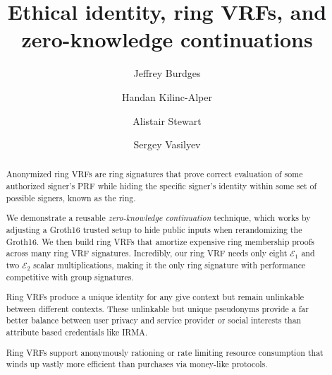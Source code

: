 \documentclass[runningheads,evcountsame,a4paper,11pt,orivec]{llncs}
\title{Ethical identity, ring VRFs, and zero-knowledge continuations}
\author{Jeffrey Burdges \and Handan Kilinc-Alper \and Alistair Stewart \and Sergey Vasilyev}
\date{}
\def\eprint#1#2{#2} %
\def\eprintsmallskip{\smallskip}{}
\begin{document}
	
\maketitle

\begin{abstract}
Anonymized ring VRFs are ring signatures that prove correct evaluation
of some authorized signer's PRF while hiding the specific signer's
identity within some set of possible signers, known as the ring.

\eprintsmallskip
We demonstrate a reusable {\em zero-knowledge continuation} technique,
which works by adjusting a Groth16 trusted setup to hide public inputs
when rerandomizing the Groth16.  We then build ring VRFs that amortize
expensive ring membership proofs across many ring VRF signatures.
%
Incredibly, our ring VRF needs only eight $\mathcal{E}_1$ and two
$\mathcal{E}_2$ scalar multiplications, making it the only ring signature
with performance competitive with group signatures.

\eprintsmallskip
Ring VRFs produce a unique identity for any give context but remain
unlinkable between different contexts.  These unlinkable but unique
pseudonyms provide a far better balance between user privacy and service
provider or social interests than attribute based credentials like IRMA.

\eprintsmallskip
Ring VRFs support anonymously rationing or rate limiting resource
consumption that winds up vastly more efficient than purchases via money-like protocols.
\end{abstract}



% 
















\appendix

% 






\end{document}
